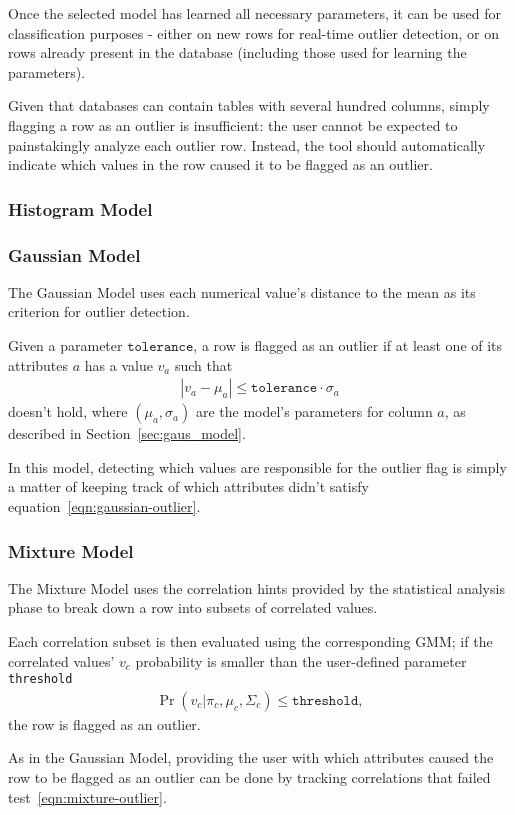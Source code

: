 Once the selected model has learned all necessary parameters, it can be used for classification purposes - either on new rows for real-time outlier detection, or on rows already present in the database (including those used for learning the parameters).

Given that databases can contain tables with several hundred columns, simply flagging a row as an outlier is insufficient: the user cannot be expected to painstakingly analyze each outlier row. Instead, the tool should automatically indicate which values in the row caused it to be flagged as an outlier.

\subsubsection{Histogram Model}
\subsubsection{Gaussian Model}
The Gaussian Model uses each numerical value's distance to the mean as its criterion for outlier detection. 

Given a parameter $\texttt{tolerance}$, a row is flagged as an outlier if at least one of its attributes $a$ has a value $v_a$ such that 
\begin{align}
|v_a - \mu_a| \leq \texttt{tolerance} \cdot \sigma_a
\label{eqn:gaussian-outlier}
\end{align}
doesn't hold, where $(\mu_a, \sigma_a)$ are the model's parameters for column $a$, as described in Section~\ref{sec:gaus_model}.

In this model, detecting which values are responsible for the outlier flag is simply a matter of keeping track of which attributes didn't satisfy equation~\ref{eqn:gaussian-outlier}.
 
\subsubsection{Mixture Model}
The Mixture Model uses the correlation hints provided by the statistical analysis phase to break down a row into subsets of correlated values.

Each correlation subset is then evaluated using the corresponding GMM; if the correlated values' $v_c$ probability is smaller than the user-defined parameter \texttt{threshold}
\begin{align}
\Pr(v_c | \pi_c, \mu_c, \Sigma_c) \leq \texttt{threshold}, 
\label{eqn:mixture-outlier}
\end{align}
the row is flagged as an outlier.

As in the Gaussian Model, providing the user with which attributes caused the row to be flagged as an outlier can be done by tracking correlations that failed test~\ref{eqn:mixture-outlier}.
